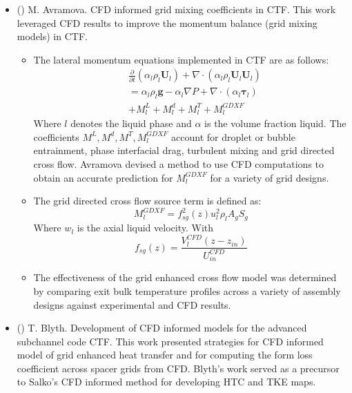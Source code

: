 
\begin{itemize}
    \item (\checkmark) M. Avramova.  CFD informed grid mixing coefficients in CTF.  This work leveraged CFD results to improve the momentum balance (grid mixing models) in CTF. \cite{avramova2007}
    
    \begin{itemize}
    	
    	\item The lateral momentum equations implemented in CTF are as follows:
    	\begin{align}
    	& \frac{\partial }{\partial t}(\alpha_l \rho_l \mathbf U_l)
    	+ \nabla \cdot (\alpha_l \rho_l \mathbf U_l \mathbf U_l) \nonumber \\
    	&= \alpha_l \rho_l \mathbf{g} - \alpha_l \nabla P + 
    	\nabla \cdot (\alpha_l \bm{\tau}_l) \nonumber \\
    	&+ M^L_l + M^d_l + M^T_l + M_l^{GDXF}
    	\end{align}
    	Where $l$ denotes the liquid phase and $\alpha$ is the volume fraction liquid.  The coefficients $M^L, M^d, M^T, M_l^{GDXF}$ account for droplet or bubble entrainment, phase interfacial drag, turbulent mixing and grid directed cross flow.  Avramova devised a method to use CFD computations to obtain an accurate prediction for $M_l^{GDXF}$ for a variety of grid designs.
    	
    	\item The grid directed cross flow source term is defined as:
    	\begin{equation}
    	M_l^{GDXF} = f^2_{sg}(z) u_l^2 \rho_l A_g S_g
    	\end{equation}
    	Where $w_l$ is the axial liquid velocity.
    	With
    	\begin{equation}
    	f_{sg}(z) = \frac{V^{CFD}_l(z-z_{in})}{U^{CFD}_{in}}
    	\end{equation}
    	
    	\item The effectiveness of the grid enhanced cross flow model was determined by comparing exit bulk temperature profiles across a variety of assembly designs against experimental and CFD results.
    	
    \end{itemize}
    
    \item (\checkmark) T. Blyth.  Development of CFD informed models for the advanced subchannel code CTF.  This work presented strategies for CFD informed model of grid enhanced heat transfer and for computing the form loss coefficient across spacer grids from CFD.  Blyth's work served as a precursor to Salko's CFD informed method for developing HTC and TKE maps.
    

\end{itemize}
